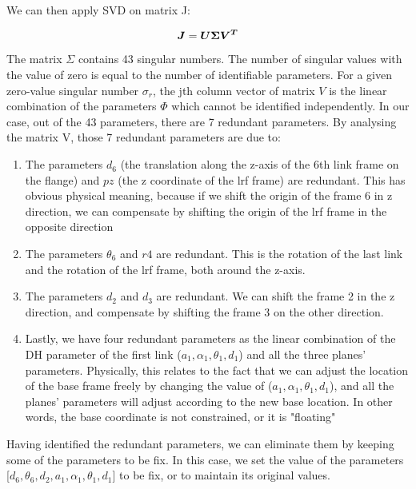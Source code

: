 We can then apply SVD on matrix J:

\begin{equation}
 \vb*{J} = \vb*{U}\vb*{\Sigma}\vb*{V^T}
\end{equation}

The matrix ${\Sigma}$ contains 43 singular numbers. The number of singular values with the value of zero is equal to the number of identifiable parameters. For a given zero-value singular number $\sigma_r$, the jth column vector of matrix $V$ is the linear combination of the parameters $\Phi$ which cannot be identified independently. 
In our case, out of the 43 parameters, there are 7 redundant parameters. By analysing the matrix V, those 7 redundant parameters are due to:
\begin{enumerate}
\item The parameters $d_6$ (the translation along the z-axis of the 6th link frame on the flange) and $pz$ (the z coordinate of the \ac{lrf} frame) are redundant. This has obvious physical meaning, because if we shift the origin of the frame 6 in z direction, we can compensate by shifting the origin of the \ac{lrf} frame in the opposite direction
\item The parameters $\theta_6$ and $r4$ are redundant. This is the rotation of the last link and the rotation of the \ac{lrf} frame, both around the z-axis. 
\item The parameters $d_2$ and $d_3$ are redundant. We can shift the frame 2 in the z direction, and compensate by shifting the frame 3 on the other direction. 
\item Lastly, we have four redundant parameters as the linear combination of the DH parameter of the first link ($a_1, \alpha_1, \theta_1, d_1$) and all the three planes' parameters. Physically, this relates to the fact that we can adjust the location of the base frame freely by changing the value of ($a_1, \alpha_1, \theta_1, d_1$), and all the planes' parameters will adjust according to the new base location. In other words, the base coordinate is not constrained, or it is "floating"
\end{enumerate}

Having identified the redundant parameters, we can eliminate them by keeping some of the parameters to be fix. In this case, we set the value of the parameters [$d_6, \theta_6, d_2, a_1, \alpha_1, \theta_1, d_1$] to be fix, or to maintain its original values. 
